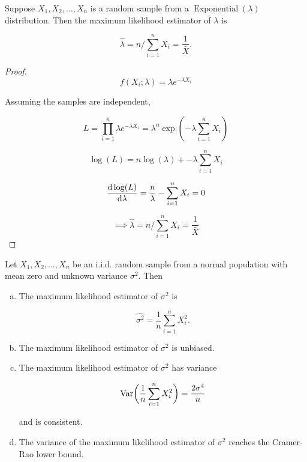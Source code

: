 \begin{proposition} Suppose \(X_1, X_2, \ldots, X_n\) is a random sample from a \(\operatorname{Exponential}(\lambda)\) distribution. Then the maximum likelihood estimator of \(\lambda\) is

\[
\hat{\lambda} = n / \sum_{i=1}^n X_i = \frac{1}{\bar{X}}.
\]

\end{proposition}

\begin{proof}

\[
f(X_i; \lambda) = \lambda e^{-\lambda X_i}
\]

Assuming the samples are independent,

\[
L = \prod_{i=1}^n \lambda e^{-\lambda X_i} = \lambda^n \exp(-\lambda \sum_{i=1}^n X_i)
\]

\[
\log(L) = n \log(\lambda) + -\lambda \sum_{i=1}^n X_i
\]

\[
\deriv{\log(L)}{\lambda} = \frac{n}{\lambda} - \sum_{i=1}^n X_i = 0
\]

\[
\implies 
\hat{\lambda} = n / \sum_{i=1}^n X_i = \frac{1}{\bar{X}}
\]


\end{proof}

\begin{proposition} Let \(X_1, X_2, \ldots, X_n\) be an i.i.d. random sample from a normal population with mean zero and unknown variance \(\sigma^2\). Then

\begin{enumerate}[(a)]

\item The maximum likelihood estimator of \(\sigma^2\) is

\[
\hat{\sigma^2} = \frac{1}{n} \sum_{i=1}^n X_i^2.
\]

\item The maximum likelihood estimator of \(\sigma^2\) is unbiased.

\item The maximum likelihood estimator of \(\sigma^2\) has variance

\[
\Var \bigg( \frac{1}{n} \sum_{i=1}^n X_i^2 \bigg)  =  \frac{2 \sigma^4}{n}
\]

and is consistent.

\item The variance of the maximum likelihood estimator of \(\sigma^2\) reaches the Cramer-Rao lower bound.

\end{enumerate}

\end{proposition}

